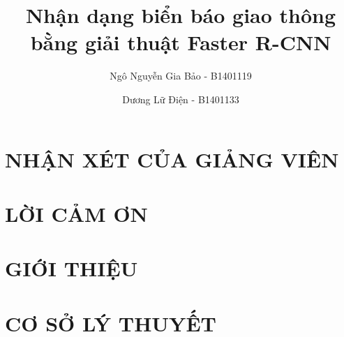 \documentclass[a4paper,12pt,oneside]{report}
\title{Nhận dạng biển báo giao thông bằng giải thuật Faster R-CNN}						%
\author{Ngô Nguyễn Gia Bảo - B1401119 \and Dương Lữ Điện - B1401133}		%
\begin{document}


\chapter*{NHẬN XÉT CỦA GIẢNG VIÊN}


\chapter*{LỜI CẢM ƠN}


\tableofcontents
\listoffigures

\clearpage
{}	%

\chapter{GIỚI THIỆU}


\chapter{CƠ SỞ LÝ THUYẾT}

% 
% 
% 
% 
% 
% 

{}

\end{document}
